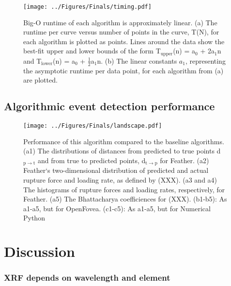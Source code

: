 \documentclass[%
  aip,12pt,tightenlines,
  amsthm,
 amsmath,amssymb
]{article}
\newcommand{\fLabel}[1]{\label{figure:#1}}
\newcommand{\sLabel}[1]{\label{section:#1}}
\newcommand{\firstp}[0]{}
\newcommand{\pl}[0]{\vspace{6pt}}
\newcommand{\pEndF}[0]{ \\ }
\newcommand{\pStartF}[0]{ }
\newcommand{\name}[0]{Feather}
\newcommand{\figwidth}[0]{\linewidth}
\begin{document}
\begin{figure}
\centering
\texttt{[image: ../Figures/Finals/timing.pdf]}%
\caption[Runtime versus length of curve]{\noindent\fLabel{Timing}\pStartF  Big-O runtime of each algorithm is approximately linear. (a) The runtime per curve versus number of points in the curve, T(N), for each algorithm is plotted as points. Lines around the data show the best-fit upper and lower bounds of the form T$_{\mathrm{upper}}$(n) = a$_0$ + 2a$_1$n  and T$_{\mathrm{lower}}$(n) = a$_0$ + $\frac{1}{2}$a$_1$n. (b) The linear constants $a_1$, representing the asymptotic runtime per data point, for each algorithm from (a) are plotted. \pEndF}
\end{figure}

\subsection{\sLabel{Performance}Algorithmic event detection performance}



\begin{figure}
\centering
\texttt{[image: ../Figures/Finals/landscape.pdf]}%
\caption[Algorithm Performance]{\noindent\fLabel{Performance}\pStartF Performance of this algorithm compared to the baseline algorithms. (a1) The distributions of distances from predicted to true points d$_{\mathrm{p}\rightarrow\mathrm{t}}$ and from true to predicted points, d$_{\mathrm{t}\rightarrow\mathrm{p}}$ for \name{}. (a2) \name{}`s two-dimensional distribution of predicted and actual rupture force and loading rate, as defined by (XXX). (a3 and a4) The histograms of rupture forces and loading rates, respectively, for \name{}.  (a5) The Bhattacharya coefficiences for (XXX). (b1-b5): As a1-a5, but for OpenFovea. (c1-c5): As a1-a5, but for Numerical Python \pEndF }
\end{figure}



\section{\sLabel{Discussion}Discussion}


\firstp \pl

\subsubsection{\sLabel{Beer}XRF depends on wavelength and element}
\end{document}
